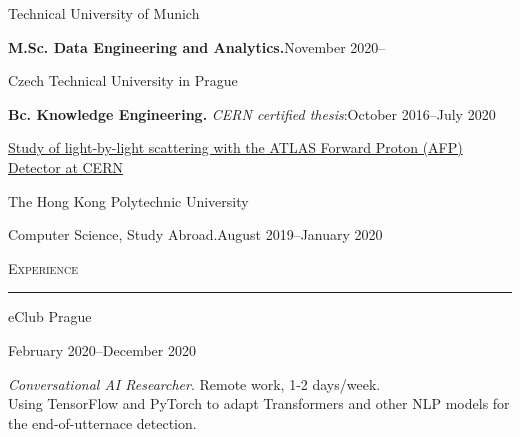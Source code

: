\documentclass[10pt]{article}
\begin{document}
\begin{large}
    Technical University of Munich\\[0.2em]
\end{large}
\begin{normalsize}
    \textbf{M.Sc. Data Engineering and Analytics.}\hfill November 2020--\\[0.8em]
\end{normalsize}
\begin{large}
    Czech Technical University in Prague\\[0.2em]
\end{large}
\begin{normalsize}
    \textbf{Bc. Knowledge Engineering.}\textit{ CERN certified thesis}:\hfill October 2016--July 2020\\[0.2em]
\end{normalsize}
\begin{normalsize}
    \href{http://cds.cern.ch/record/2722599?ln=en}{Study of light-by-light scattering with the ATLAS Forward Proton (AFP) Detector at CERN}\\[0.8em]
\end{normalsize}
\begin{large}
    The Hong Kong Polytechnic University\\[0.2em]
\end{large}
\begin{normalsize}
    Computer Science, Study Abroad.\hfill August 2019--January 2020\\
\end{normalsize}


\begin{Large}
    \textsc{Experience}
    \vspace{0.4em}
    \hrule
    \vspace{0.4em}
\end{Large}

\begin{large}
    eClub Prague\hfill
    \begin{small}
        February 2020--December 2020\\[0.2em]
    \end{small}
\end{large}
\begin{normalsize}
    \textit{Conversational AI Researcher}. Remote work, 1-2 days/week.\\[0.2em]
    Using TensorFlow and PyTorch to adapt Transformers and other NLP models for the end-of-utternace detection.\\
\end{normalsize}
\end{document}
